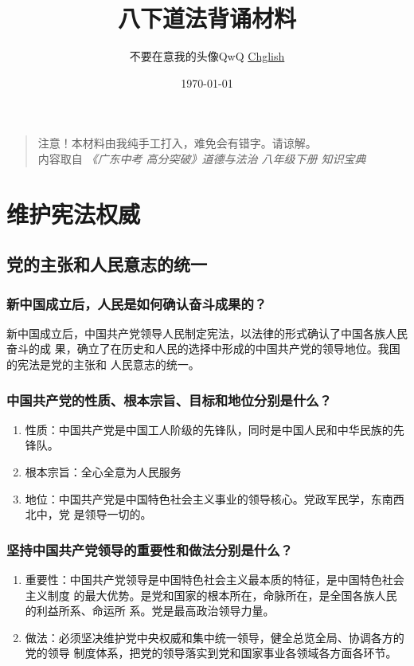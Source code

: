 \documentclass[11pt]{article}
\author{不要在意我的头像QwQ \href{https://youlanjie.github.io/}{Chglish}}
\date{\today}
\title{八下道法背诵材料}
\begin{document}
\maketitle
\tableofcontents

\begin{verse}
注意！本材料由我纯手工打入，难免会有错字。请谅解。\\
内容取自 \emph{《广东中考 高分突破》道德与法治 八年级下册 知识宝典}\\
\end{verse}

\section{维护宪法权威}
\label{sec:org49e4a5b}
\subsection{党的主张和人民意志的统一}
\label{sec:orgb05f81a}
\subsubsection{新中国成立后，人民是如何确认奋斗成果的？}
\label{sec:org3f49698}
新中国成立后，中国共产党领导人民制定宪法，以法律的形式确认了中国各族人民奋斗的成
果，确立了在历史和人民的选择中形成的中国共产党的领导地位。我国的宪法是党的主张和
人民意志的统一。
\subsubsection{中国共产党的性质、根本宗旨、目标和地位分别是什么？}
\label{sec:org750cda5}
\begin{enumerate}
\item 性质：中国共产党是中国工人阶级的先锋队，同时是中国人民和中华民族的先锋队。
\item 根本宗旨：全心全意为人民服务
\item 地位：中国共产党是中国特色社会主义事业的领导核心。党政军民学，东南西北中，党
是领导一切的。
\end{enumerate}
\subsubsection{坚持中国共产党领导的重要性和做法分别是什么？}
\label{sec:orga314aa1}
\begin{enumerate}
\item 重要性：中国共产党领导是中国特色社会主义最本质的特征，是中国特色社会主义制度
的最大优势。是党和国家的根本所在，命脉所在，是全国各族人民的利益所系、命运所
系。党是最高政治领导力量。
\item 做法：必须坚决维护党中央权威和集中统一领导，健全总览全局、协调各方的党的领导
制度体系，把党的领导落实到党和国家事业各领域各方面各环节。
\end{enumerate}
\end{document}
